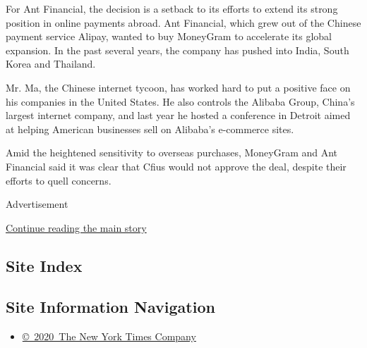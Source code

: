 For Ant Financial, the decision is a setback to its efforts to extend
its strong position in online payments abroad. Ant Financial, which grew
out of the Chinese payment service Alipay, wanted to buy MoneyGram to
accelerate its global expansion. In the past several years, the company
has pushed into India, South Korea and Thailand.

Mr. Ma, the Chinese internet tycoon, has worked hard to put a positive
face on his companies in the United States. He also controls the Alibaba
Group, China's largest internet company, and last year he hosted a
conference in Detroit aimed at helping American businesses sell on
Alibaba's e-commerce sites.

Amid the heightened sensitivity to overseas purchases, MoneyGram and Ant
Financial said it was clear that Cfius would not approve the deal,
despite their efforts to quell concerns.

Advertisement

\protect\hyperlink{after-bottom}{Continue reading the main story}

\hypertarget{site-index}{%
\subsection{Site Index}\label{site-index}}

\hypertarget{site-information-navigation}{%
\subsection{Site Information
Navigation}\label{site-information-navigation}}

\begin{itemize}
\tightlist
\item
  \href{https://help.nytimes.com/hc/en-us/articles/115014792127-Copyright-notice}{©~2020~The
  New York Times Company}
\end{itemize}


